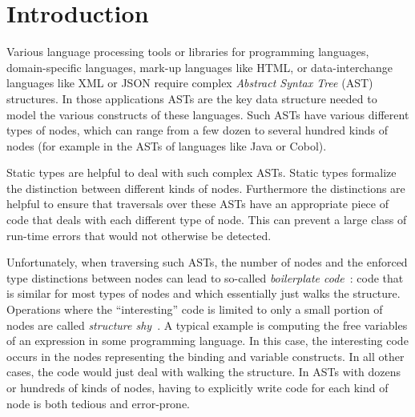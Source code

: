 \section{Introduction}

Various language processing tools or libraries for programming
languages, domain-specific languages, mark-up languages like HTML, or
data-interchange languages like XML or JSON require complex
\emph{Abstract Syntax Tree} (AST) structures. In those applications
ASTs are the key data structure needed to model the various constructs
of these languages. Such ASTs have various different types of nodes,
which can range from a few dozen to several hundred kinds of nodes
(for example in the ASTs of languages like Java or Cobol).

Static types are helpful to deal with such complex ASTs.  Static
types formalize the distinction between different kinds of
nodes. Furthermore the distinctions are helpful to ensure that
traversals over these ASTs have an appropriate piece of code
that deals with each different type of node. This can prevent a large
class of run-time errors that would not otherwise be detected.


Unfortunately, when traversing such ASTs, the number of nodes and the
enforced type distinctions between nodes can lead to so-called
\emph{boilerplate code}~\cite{ralf03syb}: code that is similar for most types of nodes and which
essentially just walks the structure. Operations where the ``interesting'' code is limited to only a small portion of nodes are called \emph{structure shy}~\cite{DemeterBook}.
A typical example is computing the free
variables of an expression in some programming language. In this
case, the interesting code occurs in the nodes representing the
binding and variable constructs. In all other cases, the code would just deal with
walking the structure. In ASTs with dozens or hundreds of
kinds of nodes, having to explicitly write code for each kind of node is both tedious and error-prone.

